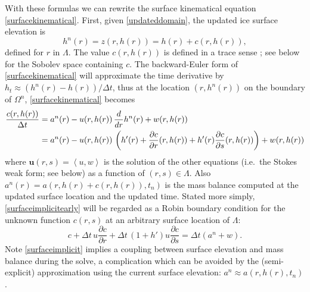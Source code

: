 \documentclass[letterpaper,final,12pt,reqno]{amsart}
\newcommand{\bu}{\mathbf{u}}
\begin{document}
With these formulas we can rewrite the surface kinematical equation \eqref{surfacekinematical}.  First, given \eqref{updateddomain}, the updated ice surface elevation is
    $$h^n(r) = z(r,h(r)) = h(r) + c(r,h(r)),$$
defined for $r$ in $\Lambda$.  The value $c(r,h(r))$ is defined in a trace sense \cite{Evans2010}; see below for the Sobolev space containing $c$.  The backward-Euler form of \eqref{surfacekinematical} will approximate the time derivative by $h_t \approx (h^n(r) - h(r))/\Delta t$, thus at the location $(r,h^n(r))$ on the boundary of $\Omega^n$, \eqref{surfacekinematical} becomes
\begin{align}
\frac{c(r,h(r))}{\Delta t} &= a^n(r) - u(r,h(r))\,\frac{d}{d r} h^n(r) + w(r,h(r)) \notag \\
  &= a^n(r) - u(r,h(r))\,\left(h'(r) + \frac{\partial c}{\partial r}(r,h(r)) + h'(r) \frac{\partial c}{\partial s}(r,h(r))\right) + w(r,h(r)) \label{surfaceimplicitearly}
\end{align}
where $\bu(r,s)=\left<u,w\right>$ is the solution of the other equations (i.e.~the Stokes weak form; see below) as a function of $(r,s)\in\Lambda$.  Also $a^n(r) = a\left(r,h(r) + c(r,h(r)),t_n\right)$ is the mass balance computed at the updated surface location and the updated time.  Stated more simply, \eqref{surfaceimplicitearly} will be regarded as a Robin boundary condition for the unknown function $c(r,s)$ at an arbitrary surface location of $\Lambda$:
\begin{equation}
c + \Delta t\,u \frac{\partial c}{\partial r} + \Delta t\,(1+h') u \frac{\partial c}{\partial s} = \Delta t \left(a^n + w\right). \label{surfaceimplicit}
\end{equation}
Note \eqref{surfaceimplicit} implies a coupling between surface elevation and mass balance during the solve, a complication which can be avoided by the (semi-explicit) approximation using the current surface elevation: $a^n \approx a(r,h(r),t_n)$.
\end{document}
